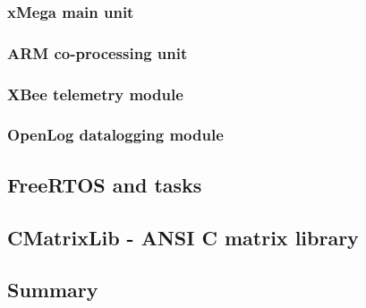 \subsubsection{xMega main unit}

\subsubsection{ARM co-processing unit}

\subsubsection{XBee telemetry module}

\subsubsection{OpenLog datalogging module}

\subsection{FreeRTOS and tasks}

\subsection{CMatrixLib - ANSI C matrix library}

\subsection{Summary}